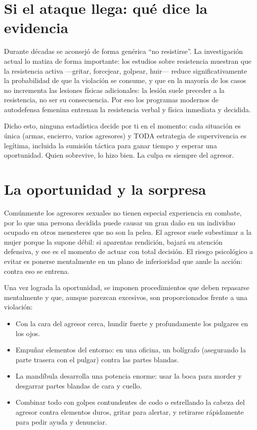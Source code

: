 \section{Si el ataque llega: qué dice la evidencia}

Durante décadas se aconsejó de forma genérica \enquote{no resistirse}. La investigación actual lo matiza de forma importante: los estudios sobre resistencia \citep{ullman1997, ullman2007, tark2014} muestran que la resistencia activa ---gritar, forcejear, golpear, huir--- reduce significativamente la probabilidad de que la violación se consume, y que en la mayoría de los casos no incrementa las lesiones físicas adicionales: la lesión suele preceder a la resistencia, no ser su consecuencia. Por eso los programas modernos de autodefensa femenina entrenan la resistencia verbal y física inmediata y decidida.

Dicho esto, ninguna estadística decide por ti en el momento: cada situación es única (armas, encierro, varios agresores) y TODA estrategia de supervivencia es legítima, incluida la sumisión táctica para ganar tiempo y esperar una oportunidad. Quien sobrevive, lo hizo bien. La culpa es siempre del agresor.

\section{La oportunidad y la sorpresa}

Comúnmente los agresores sexuales no tienen especial experiencia en combate, por lo que una persona decidida puede causar un gran daño en un individuo ocupado en otros menesteres que no son la pelea. El agresor suele subestimar a la mujer porque la supone débil: si aparentas rendición, bajará su atención defensiva, y ese es el momento de actuar con total decisión. El riesgo psicológico a evitar es ponerse mentalmente en un plano de inferioridad que anule la acción: contra eso se entrena.

Una vez lograda la oportunidad, se imponen procedimientos que deben repasarse mentalmente y que, aunque parezcan excesivos, son proporcionados frente a una violación:

\begin{itemize}
  \item Con la cara del agresor cerca, hundir fuerte y profundamente los pulgares en los ojos.
  \item Empuñar elementos del entorno: en una oficina, un bolígrafo (asegurando la parte trasera con el pulgar) contra las partes blandas.
  \item La mandíbula desarrolla una potencia enorme: usar la boca para morder y desgarrar partes blandas de cara y cuello.
  \item Combinar todo con golpes contundentes de codo o estrellando la cabeza del agresor contra elementos duros, gritar para alertar, y retirarse rápidamente para pedir ayuda y denunciar.
\end{itemize}

